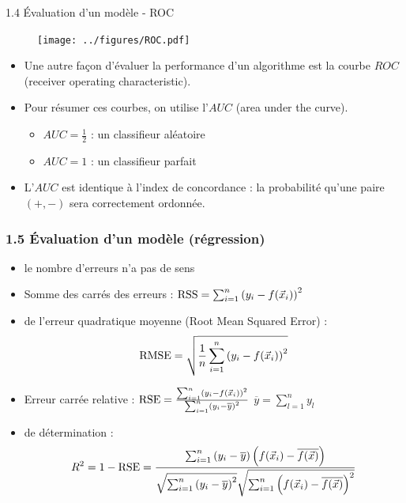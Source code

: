 \begin{frame}{1.4 Évaluation d'un modèle - ROC}
  \begin{figure}[htb]
    \texttt{[image: ../figures/ROC.pdf]}
  \end{figure}
  \begin{itemize} 
    \item Une autre façon d'évaluer la performance d'un algorithme est la courbe $ROC$ (receiver operating characteristic). 
    \item Pour résumer ces courbes, on utilise l'$AUC$ (area under the curve). 
    \begin{itemize}
      \item $AUC = \frac{1}{2}$ : un classifieur aléatoire
      \item $AUC = 1$ : un classifieur parfait
    \end{itemize}
    \item L'$AUC$ est identique à l'index de concordance : la probabilité qu'une paire $(+,-)$ sera correctement ordonnée. 
  \end{itemize}
\end{frame}


\begin{frame}
  \frametitle{1.5 Évaluation d'un modèle (régression)}
  \begin{itemize}
  \item {} le nombre d'erreurs n'a pas de sens
    \pause
  \item Somme des carrés des erreurs : $\text{RSS} = \sum_{i=1}^n \left(y_i - f(\vec{x}_i) \right)^2$
  \item {} de l'erreur quadratique moyenne \textcolor{gray!70}{(Root Mean Squared Error)} : 
    \[\text{RMSE} = \sqrt{\frac1n \sum_{i=1}^n \left(y_i - f(\vec{x}_i) \right)^2}\]
  \item Erreur carrée relative : $\text{RSE} = \frac{\sum_{i=1}^n \left(y_i - f(\vec{x}_i) \right)^2}{\sum_{i=1}^n \left(y_i - \overline{y} \right)^2}$ \hspace{1em} $\overline{y} = \sum_{l=1}^n y_l$
  \item {} de détermination :
    \[
      R^2 = 1 - \text{RSE} = \frac{\sum_{i=1}^n \left( y_i - \overline{y} \right) \left( f(\vec{x}_i) - \overline{f(\vec{x})} \right) }{\sqrt{\sum_{i=1}^n \left(y_i - \overline{y} \right)^2} \sqrt{\sum_{i=1}^n \left(f(\vec{x}_i) - \overline{f(\vec{x})} \right)^2}}
    \]
  \end{itemize}
\end{frame}

